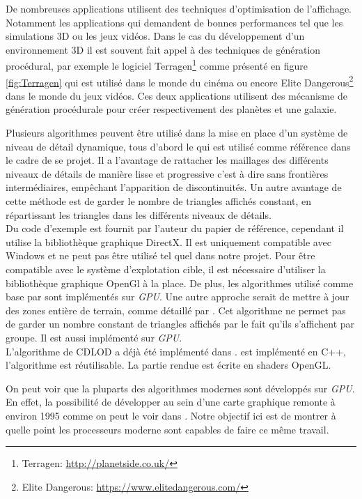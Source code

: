 \documentclass[12pt]{report}
\begin{document}
De nombreuses applications utilisent des techniques d'optimisation de
l'affichage. Notamment les applications qui demandent de bonnes
performances tel que les simulations 3D ou les jeux vidéos.
Dans le cas du développement d'un environnement 3D il est souvent fait
appel à des techniques de génération procédural, par exemple le logiciel
Terragen\footnote{Terragen: \url{http://planetside.co.uk/}} comme
présenté en figure \ref{fig:Terragen} qui est utilisé dans le monde du
cinéma ou encore Elite Dangerous\footnote{Elite Dangerous:
\url{https://www.elitedangerous.com/}} dans le monde du jeux vidéos.
Ces deux applications utilisent des mécanisme de génération procédurale
pour créer respectivement des planètes et une galaxie.

Plusieurs algorithmes peuvent être utilisé dans la mise en place d'un
système de niveau de détail dynamique, tous d'abord le \cite{CDLOD} qui
est utilisé comme référence dans le cadre de se projet.  Il a l'avantage
de rattacher les maillages des différents niveaux de détails de manière
lisse et progressive c'est à dire sans frontières intermédiaires,
empêchant l'apparition de discontinuités.  Un autre avantage de cette
méthode est de garder le nombre de triangles affichés constant, en
répartissant les triangles dans les différents niveaux de détails.\\
Du code d'exemple est fournit par l'auteur du papier de référence,
cependant il utilise la bibliothèque graphique DirectX. Il est
uniquement compatible avec Windows et ne peut pas être utilisé tel quel
dans notre projet.  Pour être compatible avec le système d'explotation
cible, il est nécessaire d'utiliser la bibliothèque graphique OpenGl à la
place. De plus, les algorithmes utilisé comme base par \cite{CDLOD} sont
implémentés sur \emph{GPU}.  Une autre approche serait de mettre à jour
des zones entière de terrain, comme détaillé par \cite{MassiveTerrain}.
Cet algorithme ne permet pas de garder un nombre constant de triangles
affichés par le fait qu'ils s'affichent par groupe. Il est aussi
implémenté sur \emph{GPU}.\\
L'algorithme de CDLOD a déjà été implémenté dans \cite{WorldGenerator}.
\cite{WorldGenerator} est implémenté en C++, l'algorithme est
réutilisable. La partie rendue est écrite en shaders OpenGL.

On peut voir que la pluparts des algorithmes modernes sont développés
sur \emph{GPU}.  En effet, la possibilité de développer au sein d'une
carte graphique remonte à environ 1995 comme on peut le voir dans
\cite{EvoGPU}. Notre objectif ici est de montrer à quelle point les
processeurs moderne sont capables de faire ce même travail.
\end{document}
